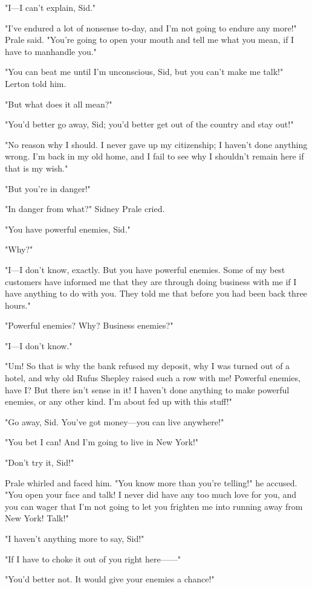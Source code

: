 \documentclass{novel}
\begin{document}
"I---I can't explain, Sid."

"I've endured a lot of nonsense to-day, and I'm not going to endure any more!" Prale said. "You're going to open your mouth and tell me what you mean, if I have to manhandle you."

"You can beat me until I'm unconscious, Sid, but you can't make me talk!" Lerton told him.

"But what does it all mean?"

"You'd better go away, Sid; you'd better get out of the country and stay out!"

"No reason why I should. I never gave up my citizenship; I haven't done anything wrong. I'm back in my old home, and I fail to see why I shouldn't remain here if that is my wish."

"But you're in danger!"

"In danger from what?" Sidney Prale cried.

"You have powerful enemies, Sid."

"Why?"

"I---I don't know, exactly. But you have powerful enemies. Some of my best customers have informed me that they are through doing business with me if I have anything to do with you. They told me that before you had been back three hours."

"Powerful enemies? Why? Business enemies?"

"I---I don't know."

"Um! So that is why the bank refused my deposit, why I was turned out of a hotel, and why old Rufus Shepley raised such a row with me! Powerful enemies, have I? But there isn't sense in it! I haven't done anything to make powerful enemies, or any other kind. I'm about fed up with this stuff!"

"Go away, Sid. You've got money---you can live anywhere!"

"You bet I can! And I'm going to live in New York!"

"Don't try it, Sid!"

Prale whirled and faced him. "You know more than you're telling!" he accused. "You open your face and talk! I never did have any too much love for you, and you can wager that I'm not going to let you frighten me into running away from New York! Talk!"

"I haven't anything more to say, Sid!"

"If I have to choke it out of you right here------"

"You'd better not. It would give your enemies a chance!"
\end{document}
